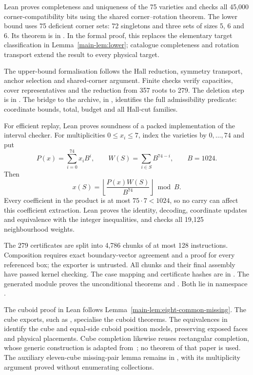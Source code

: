 \documentclass[11pt]{article}
\theoremstyle{remark}
\begin{document}
Lean proves completeness and uniqueness of the 75 varieties and checks all
45,000 corner-compatibility bits using the shared corner--rotation theorem.
The lower bound uses 75 deficient corner sets: 72 singletons and three
sets of sizes 5, 6 and 6. Its theorem is
 in . In the formal proof, this replaces the elementary
target classification in Lemma~\ref{main-lem:lower}; catalogue completeness and
rotation transport extend the result to every physical target.

The upper-bound formalisation follows the Hall reduction, symmetry
transport, anchor selection and shared-corner argument. Finite checks
verify capacities, cover representatives and the reduction from 357 roots
to 279. The deletion step is 
in . The bridge to the archive, in
, identifies the full admissibility
predicate: coordinate bounds, total, budget and all Hall-cut families.

For efficient replay, Lean proves soundness of a packed implementation of
the interval checker. For multiplicities $0\le x_i\le7$, index the varieties
by $0,\ldots,74$ and put
\[
 P(x)=\sum_{i=0}^{74}x_i B^i,\qquad
 W(S)=\sum_{i\in S}B^{74-i},\qquad B=1024.
\]
Then
\[
 x(S)=\left\lfloor\frac{P(x)W(S)}{B^{74}}\right\rfloor\bmod B.
\]
Every coefficient in the product is at most $75\cdot7<1024$, so no carry
can affect this coefficient extraction. Lean proves the identity, decoding,
coordinate updates and equivalence with the integer inequalities, and
checks all 19,125 neighbourhood weights.

The 279 certificates are split into 4,786 chunks of at most 128
instructions. Composition requires exact boundary-vector agreement and a
proof for every referenced box; the exporter is untrusted. All chunks and
their final assembly have passed kernel checking. The case mapping and
certificate hashes are in .
The generated module 
proves the unconditional theorems  and
. Both lie in namespace
.

The cuboid proof in Lean follows Lemma~\ref{main-lem:eight-common-missing}.
The cube exports, such as , specialise the cuboid theorems.
The equivalences in  identify the cube
and equal-side cuboid position models, preserving exposed faces and physical
placements. Cube completion likewise reuses rectangular completion, whose
generic construction is adapted from~\cite{FourToThree}; no theorem of that
paper is used. The auxiliary eleven-cube missing-pair lemma remains in
, with its multiplicity argument proved
without enumerating collections.
\end{document}
